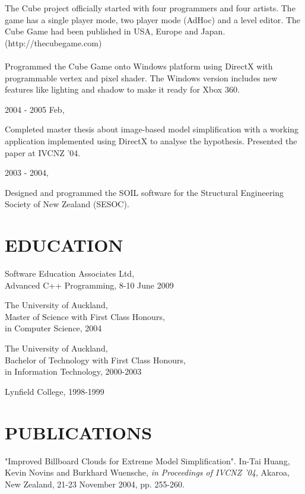 \begin{resume}
The Cube project officially started with four programmers and four artists. The game has a single player mode, two player mode (AdHoc) and a level editor. The Cube Game had been published in USA, Europe and Japan. (http://thecubegame.com)
\\\\
Programmed the Cube Game onto Windows platform using DirectX with programmable vertex and pixel shader. The Windows version includes new features like lighting and shadow to make it ready for Xbox 360.

\hspace*{-0.25in} 2004 - 2005 Feb,

Completed master thesis about image-based model simplification with a working application implemented using DirectX to analyse the hypothesis. Presented the paper at IVCNZ '04.

\hspace*{-0.25in} 2003 - 2004,

Designed and programmed the SOIL software for the Structural Engineering Society of New Zealand (SESOC).

\vspace{0.15in} 

\section{EDUCATION}
\vspace{0.1in} 
Software Education Associates Ltd,\\
Advanced C++ Programming, 8-10 June 2009

The University of Auckland,\\
Master of Science with First Class Honours,\\
in Computer Science, 2004 
 
The University of Auckland,\\
Bachelor of Technology with First Class Honours,\\
in Information Technology, 2000-2003 
 
Lynfield College, 1998-1999 

\section{PUBLICATIONS} 
\vspace{0.1in}

"Improved Billboard Clouds for Extreme Model Simplification". In-Tai Huang, Kevin Novins and Burkhard Wuensche, \textit{in Proceedings of IVCNZ '04}, Akaroa, New Zealand, 21-23 November 2004, pp. 255-260. 


\end{resume}
